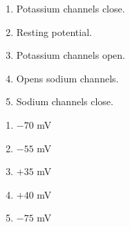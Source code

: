 \begin{enumerate}[label=\textbf{Q2.3.\arabic*}]
\begin{tikzpicture}[scale=1.2]


            \end{tikzpicture}


            \begin{wordbox}
                  \begin{enumerate}[label=(\alph*)]
                        \item Potassium channels close.
                        \item Resting potential.
                        \item Potassium channels open.
                        \item Opens sodium channels.
                        \item Sodium channels close.
                  \end{enumerate}
            \end{wordbox}
            \begin{enumerate}[label=(\arabic*)]
                  \item \(-70\) mV \quad \dotfill \quad \underline{\hspace{1cm}}\\
                  \item \(-55\) mV \quad \dotfill \quad \underline{\hspace{1cm}}\\
                  \item \(+35\) mV \quad \dotfill \quad \underline{\hspace{1cm}}\\
                  \item \(+40\) mV \quad \dotfill \quad \underline{\hspace{1cm}}\\
                  \item \(-75\) mV \quad \dotfill \quad \underline{\hspace{1cm}}
            \end{enumerate}


\end{enumerate}

